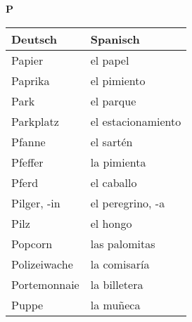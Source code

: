 \begin{flushright}\begin{Huge}\textbf{P}\end{Huge}\end{flushright}

\begin{longtable}{p{} p{}} 
\textbf{Deutsch}     & \textbf{Spanisch}                                       \\ \hline
\hline
\endhead %
Papier & el papel \\
Paprika & el pimiento\\
Park & el parque \\
Parkplatz & el estacionamiento \\
Pfanne & el sartén\\
Pfeffer & la pimienta\\
Pferd & el caballo\\
Pilger, -in & el peregrino, -a\\
Pilz & el hongo\\
Popcorn & las palomitas\\
Polizeiwache & la comisaría\\
Portemonnaie & la billetera\\
Puppe & la muñeca
\end{longtable}
